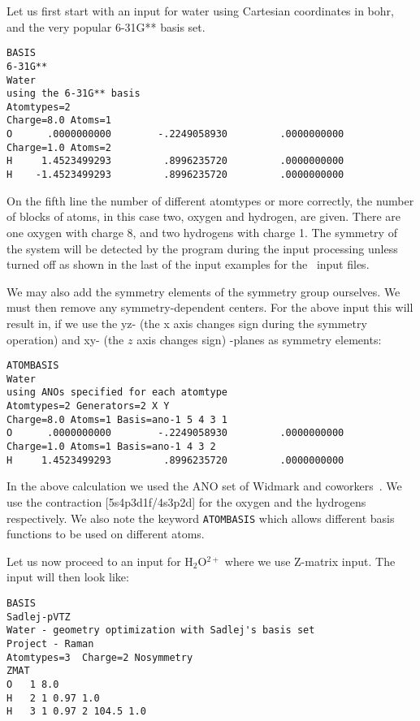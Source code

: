 Let us first start with an input for water using Cartesian coordinates
in bohr, and the very popular 6-31G** basis set.

\begin{verbatim}
BASIS
6-31G**
Water
using the 6-31G** basis
Atomtypes=2
Charge=8.0 Atoms=1
O      .0000000000        -.2249058930         .0000000000
Charge=1.0 Atoms=2
H     1.4523499293         .8996235720         .0000000000
H    -1.4523499293         .8996235720         .0000000000
\end{verbatim}

On the fifth line the number of different atomtypes or more correctly,
the number of  blocks of atoms,
in this case two, oxygen and hydrogen, are given. There are one oxygen with
charge 8, and two hydrogens with charge 1. The symmetry of the system
will be detected by the program during the input processing unless
turned off as shown in the last of the input examples for the \mol\
input files.

We may also add the symmetry elements of the
symmetry group\index{symmetry!group} ourselves. We must
then remove any symmetry-dependent centers. For the above input this
will result in, if we use the yz- (the x axis changes sign during the
symmetry operation) and xy- (the $z$ axis changes sign) -planes as
symmetry elements: 

\begin{verbatim}
ATOMBASIS
Water
using ANOs specified for each atomtype
Atomtypes=2 Generators=2 X Y
Charge=8.0 Atoms=1 Basis=ano-1 5 4 3 1
O      .0000000000        -.2249058930         .0000000000
Charge=1.0 Atoms=1 Basis=ano-1 4 3 2
H     1.4523499293         .8996235720         .0000000000
\end{verbatim}

In the above calculation we used the ANO set of
Widmark and
coworkers~\cite{powpambortca77,powbjpbortca79}. We
use the contraction
[5s4p3d1f/4s3p2d] for the oxygen and the hydrogens respectively. We
also note the keyword \verb|ATOMBASIS|\index{ATOMBASIS} which allows
different basis
functions to be used on different atoms.

Let us now proceed to an input for H$_{2}$O$^{2+}$ where we use
Z-matrix input. The  input will then look like:

\begin{verbatim}
BASIS
Sadlej-pVTZ
Water - geometry optimization with Sadlej's basis set
Project - Raman
Atomtypes=3  Charge=2 Nosymmetry
ZMAT
O   1 8.0
H   2 1 0.97 1.0
H   3 1 0.97 2 104.5 1.0
\end{verbatim}

